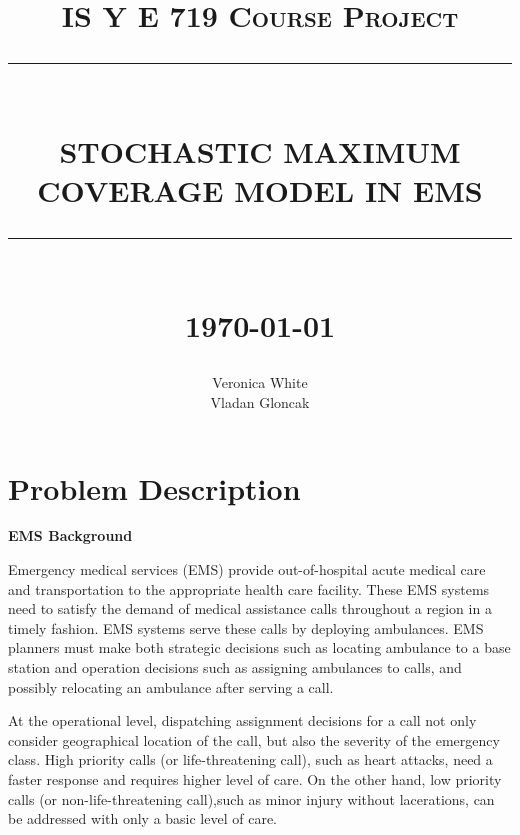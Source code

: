 \documentclass[12pt]{report}
\newcommand{\HRule}[1]{\rule{\linewidth}{#1}}
\begin{document}
\title{ \normalsize \textsc{IS Y E 719 Course Project}
		\\ [2.0cm]
		\HRule{0.5pt} \\
		\LARGE \textbf{\uppercase{Stochastic Maximum Coverage Model in EMS}}
		\HRule{2pt} \\ [0.5cm]
		\normalsize \today \vspace*{5\baselineskip}}

\date{}

\author{
		Veronica White\\ 
	    Vladan Gloncak \\
		}

\maketitle
\tableofcontents
\newpage

\sectionfont{\scshape}

\section*{Problem Description}
\textbf{EMS Background}

Emergency medical services (EMS) provide out-of-hospital acute medical care and transportation to the appropriate health care facility. These EMS systems need to satisfy the demand of medical assistance calls throughout a region in a timely fashion. EMS systems serve these calls by deploying ambulances. EMS planners must make both strategic decisions such as locating ambulance to a base station and operation decisions such as assigning ambulances to calls, and possibly relocating an ambulance after serving a call.  

At the operational level, dispatching assignment decisions for a call not only consider geographical location of the call, but also the severity of the emergency class. High priority calls (or life-threatening call), such as heart attacks, need a faster response and requires higher level of care. On the other hand, low priority calls (or non-life-threatening call),such as minor injury without lacerations, can be addressed with only a basic level of care. 
\end{document}
